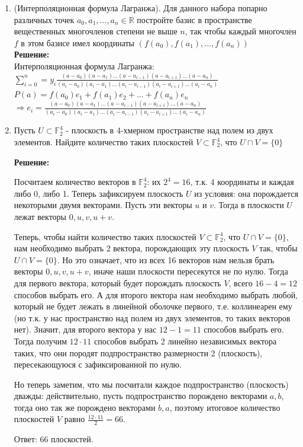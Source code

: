 \documentclass[]{book}
\theoremstyle{definition}
\newcommand{\bb}[1]{\mathbb{#1}}
\begin{document}
\begin{enumerate}[resume]
\item (Интерполяционная формула Лагранжа). Для данного набора попарно различных точек $a_0, a_1, ..., a_n\in\bb{R}$ постройте базис в пространстве вещественных многочленов степени не выше $n$, так чтобы каждый многочлен $f$ в этом базисе имел координаты $(f(a_0), f(a_1), ..., f(a_n))$\\
\textbf{Решение:}\\
Интерполяционная формула Лагранжа: ${\sum}_{i=0}^n = y_i \frac{(a-a_0)(a-a_1)...(a-a_{i-1})(a-a_{i+1})...(a-a_n)}{(a_i-a_0)(a_i-a_1)...(a_i-a_{i-1})(a_i-a_{i+1})...(a_i-a_n)}$\\
$P(a) = f(a_0)e_1 + f(a_1)e_2 +...+ f(a_n)e_n$\\
$\Longrightarrow e_i = \frac{(a-a_0)(a-a_1)...(a-a_{i-1})(a-a_{i+1})...(a-a_n)}{(a_i-a_0)(a_i-a_1)...(a_i-a_{i-1})(a_i-a_{i+1})...(a_i-a_n)}$



\item Пусть $U\subset \bb{F}^4_2$ - плоскость в 4-хмерном пространстве над полем из двух элементов. Найдите количество таких плоскостей $V\subset \bb{F}^4_2$, что $U\cap V =\{0\}$

\textbf{Решение:}

Посчитаем количество векторов в $\bb{F}^4_2$: их $2^4 = 16$, т.к. 4 координаты и каждая либо 0, либо 1. Теперь зафиксируем плоскость $U$ из условия: она порождается некоторыми двумя векторами. Пусть эти векторы $u$ и $v$. Тогда в плоскости $U$ лежат векторы $0, u, v, u + v$. 

Теперь, чтобы найти количество таких плоскостей $V\subset \bb{F}^4_2$, что $U\cap V =\{0\}$, нам необходимо выбрать 2 вектора, порождающих эту плоскость $V$ так, чтобы $U\cap V =\{0\}$. Но это означает, что из всех 16 векторов нам нельзя брать векторы $0, u, v, u + v$, иначе наши плоскости пересекутся не по нулю. Тогда для первого вектора, который будет порождать плоскость $V$, всего $16 - 4 = 12$ способов выбрать его. А для второго вектора нам необходимо выбрать любой, который не будет лежать в линейной оболочке первого, т.е. коллинеарен ему (но т.к. у нас пространство над полем из двух элементов, то таких векторов нет). Значит, для второго вектора у нас $12 - 1 = 11$ способов выбрать его. Тогда получим $12\cdot 11$ способов выбрать 2 линейно независимых вектора таких, что они породят подпространство размерности 2 (плоскость), пересекающуюся с зафиксированной по нулю. 

Но теперь заметим, что мы посчитали каждое подпространство (плоскость) дважды: действительно, пусть подпространство порождено векторами $a, b$, тогда оно так же порождено векторами $b, a$, поэтому итоговое количество плоскостей $V$ равно $\frac{12\cdot 11}{2} = 66$.

Ответ: $66$ плоскостей.



\end{enumerate}
\end{document}
